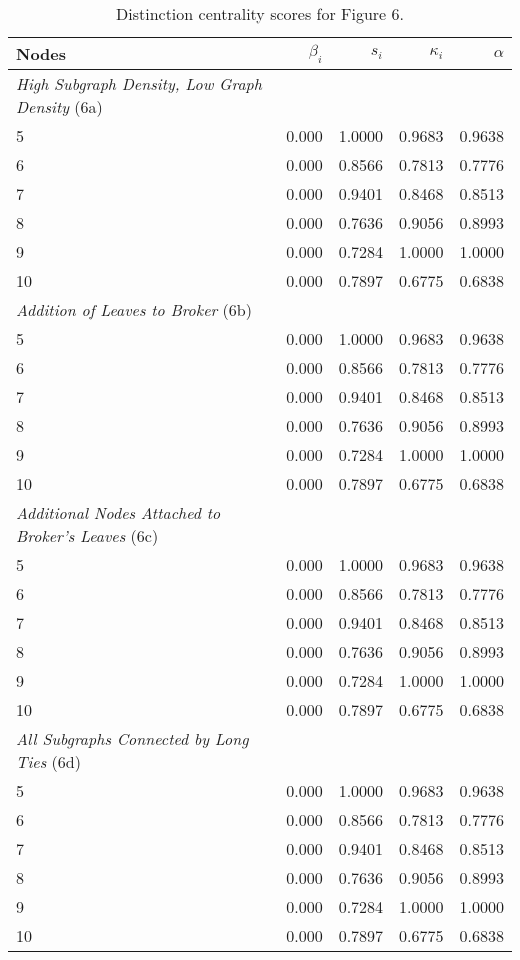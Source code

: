\begin{table}
\footnotesize
\centering
\caption{\label{tab:star}Distinction centrality scores for Figure 6.}
\centering
\begin{tabular}[t]{lrrrr}
Nodes & $\beta_i$ & $s_i$ & $\kappa_i$ & $\alpha$\\
\toprule
\midrule
\textit{High Subgraph Density, Low Graph Density} (6a)\\
5 & 0.000 & 1.0000 & 0.9683 & 0.9638\\
6 & 0.000 & 0.8566 & 0.7813 & 0.7776\\
7 & 0.000 & 0.9401 & 0.8468 & 0.8513\\
8 & 0.000 & 0.7636 & 0.9056 & 0.8993\\
9 & 0.000 & 0.7284 & 1.0000 & 1.0000\\
10 & 0.000 & 0.7897 & 0.6775 & 0.6838\\
\midrule
\midrule
\textit{Addition of Leaves to Broker} (6b)\\
5 & 0.000 & 1.0000 & 0.9683 & 0.9638\\
6 & 0.000 & 0.8566 & 0.7813 & 0.7776\\
7 & 0.000 & 0.9401 & 0.8468 & 0.8513\\
8 & 0.000 & 0.7636 & 0.9056 & 0.8993\\
9 & 0.000 & 0.7284 & 1.0000 & 1.0000\\
10 & 0.000 & 0.7897 & 0.6775 & 0.6838\\
\midrule
\midrule
\textit{Additional Nodes Attached to Broker's Leaves} (6c)\\
5 & 0.000 & 1.0000 & 0.9683 & 0.9638\\
6 & 0.000 & 0.8566 & 0.7813 & 0.7776\\
7 & 0.000 & 0.9401 & 0.8468 & 0.8513\\
8 & 0.000 & 0.7636 & 0.9056 & 0.8993\\
9 & 0.000 & 0.7284 & 1.0000 & 1.0000\\
10 & 0.000 & 0.7897 & 0.6775 & 0.6838\\
\midrule
\midrule
\textit{All Subgraphs Connected by Long Ties} (6d)\\
5 & 0.000 & 1.0000 & 0.9683 & 0.9638\\
6 & 0.000 & 0.8566 & 0.7813 & 0.7776\\
7 & 0.000 & 0.9401 & 0.8468 & 0.8513\\
8 & 0.000 & 0.7636 & 0.9056 & 0.8993\\
9 & 0.000 & 0.7284 & 1.0000 & 1.0000\\
10 & 0.000 & 0.7897 & 0.6775 & 0.6838\\
\bottomrule
\bottomrule
\end{tabular}
\end{table}